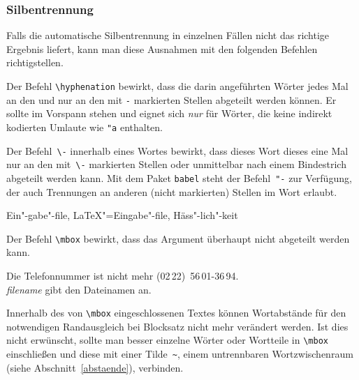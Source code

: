 \subsubsection{Silbentrennung} \label{silb}

Falls die automatische Silbentrennung in einzelnen Fällen nicht
das richtige Ergebnis liefert, kann man diese Ausnahmen mit den
folgenden Befehlen richtigstellen.

Der Befehl \lstinline|\hyphenation| bewirkt, dass die darin
angeführten Wörter jedes Mal an den und nur an den mit
\lstinline|-| markierten Stellen abgeteilt werden können.
Er sollte im Vorspann stehen und eignet sich
\emph{nur} für Wörter, die keine indirekt kodierten Umlaute wie \lstinline|"a| enthalten.

\begin{example}
\end{example}

Der Befehl~\lstinline|\-| innerhalb eines Wortes bewirkt, dass dieses Wort
dieses eine Mal nur an den mit~\lstinline|\-| markierten Stellen  oder
unmittelbar nach einem Bindestrich abgeteilt werden kann. Mit dem Paket
\texttt{babel}\cite{babel} steht der Befehl~\lstinline:"-: zur
Verfügung, der auch Trennungen an anderen (nicht markierten) Stellen im Wort
erlaubt.

\begin{LTXexample}
Ein"-gabe"-file,
\LaTeX"=Eingabe"-file,
Häss"-lich"-keit
\end{LTXexample}

Der Befehl \lstinline|\mbox| bewirkt, dass das Argument überhaupt nicht
abgeteilt werden kann.

\begin{LTXexample}
Die Telefonnummer ist nicht mehr
\mbox{(02\,22) 56\,01-36\,94}. \\
\mbox{\textit{filename}} gibt den
Dateinamen an.
\end{LTXexample}

Innerhalb des von \lstinline|\mbox| eingeschlossenen Textes können
Wortabstände für den notwendigen Randausgleich bei
Blocksatz nicht mehr verändert werden.  Ist dies nicht
erwünscht, sollte man besser einzelne Wörter oder Wortteile
in \lstinline|\mbox| einschließen und diese mit einer Tilde~\lstinline|~|,
einem untrennbaren Wortzwischenraum (siehe
Abschnitt~\ref{abstaende}), verbinden.



